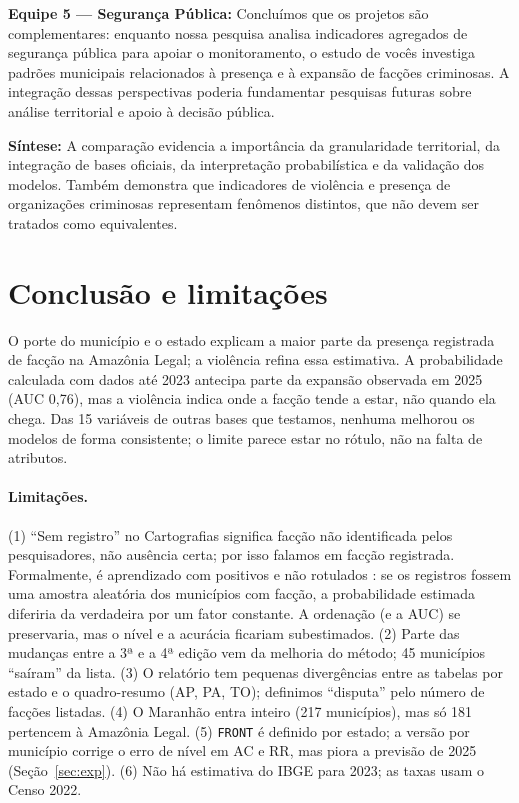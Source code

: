 \documentclass[article,12pt,oneside,a4paper,brazil,sumario=tradicional]{abntex2}
\begin{document}
\smallskip
\noindent\textbf{Equipe 5 --- Segurança Pública:} Concluímos que os projetos são
complementares: enquanto nossa pesquisa analisa indicadores agregados de segurança pública
para apoiar o monitoramento, o estudo de vocês investiga padrões municipais relacionados à
presença e à expansão de facções criminosas. A integração dessas perspectivas poderia
fundamentar pesquisas futuras sobre análise territorial e apoio à decisão pública.

\smallskip
\noindent\textbf{Síntese:} A comparação evidencia a importância da granularidade
territorial, da integração de bases oficiais, da interpretação probabilística e da validação
dos modelos. Também demonstra que indicadores de violência e presença de organizações
criminosas representam fenômenos distintos, que não devem ser tratados como equivalentes.

\section{Conclusão e limitações}\label{sec:concl}

O porte do município e o estado explicam a maior parte da presença registrada de facção na
Amazônia Legal; a violência refina essa estimativa. A probabilidade calculada com dados até
2023 antecipa parte da expansão observada em 2025 (AUC 0,76), mas a violência indica onde a
facção tende a estar, não quando ela chega. Das 15 variáveis de
outras bases que testamos, nenhuma melhorou os modelos de forma consistente; o limite parece
estar no rótulo, não na falta de atributos.

\paragraph{Limitações.} (1) ``Sem registro'' no Cartografias significa facção não
identificada pelos pesquisadores, não ausência certa; por isso falamos em facção registrada.
Formalmente, é aprendizado com positivos e não rotulados \cite{r18}: se os registros fossem
uma amostra aleatória dos municípios com facção, a probabilidade estimada diferiria da
verdadeira por um fator constante. A ordenação (e a AUC) se preservaria, mas o nível e a
acurácia ficariam subestimados. (2) Parte das mudanças entre a 3ª e a 4ª edição vem da
melhoria do método; 45 municípios ``saíram'' da lista. (3) O relatório tem pequenas
divergências entre as tabelas por estado e o quadro-resumo (AP, PA, TO); definimos
``disputa'' pelo número de facções listadas. (4) O Maranhão entra inteiro (217 municípios),
mas só 181 pertencem à Amazônia Legal. (5) \texttt{FRONT} é definido por estado; a versão
por município corrige o erro de nível em AC e RR, mas piora a previsão de 2025
(Seção~\ref{sec:exp}). (6) Não há estimativa do IBGE para 2023; as taxas usam o Censo 2022.
\end{document}

